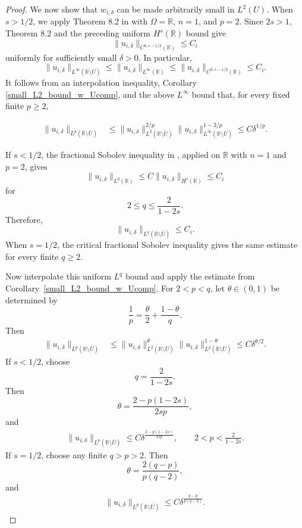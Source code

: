 \documentclass[preprint,12pt]{elsarticle}
\newcommand{\R}{\mathbb R}
\begin{document}
{\begin{proof}
We now show that $w_{i,\delta}$ can be made arbitrarily small in $L^2(U)$. When $s>1/2$, we apply Theorem 8.2 in \cite{NPV} with
$\Omega=\R$, $n=1$, and $p=2$. 
Since $2s>1$, Theorem 8.2 and the preceding uniform
$H^s(\R)$ bound give
\[
    \|u_{i,\delta}\|_{C^{0,s-1/2}(\R)}
    \leq C_i
\]
uniformly for sufficiently small $\delta>0$.
In particular,
\[
    \|u_{i,\delta}\|_{L^\infty(\R\setminus\overline U)}
    \leq
    \|u_{i,\delta}\|_{L^\infty(\R)}
    \leq
    \|u_{i,\delta}\|_{C^{0,s-1/2}(\R)}
    \leq C_i.
\]
It follows from an interpolation inequality, Corollary \ref{small_L2_bound_w_Ucomp}, and the above
$L^\infty$ bound that,
for every fixed finite $p\geq 2$,

\begin{align}\label{1_Lq_bound}
\|u_{i,\delta}\|_{L^p(\R\setminus\overline U)}
&\leq
\|u_{i,\delta}\|_{L^2(\R\setminus\overline U)}^{2/p}
\|u_{i,\delta}\|_{L^\infty(\R\setminus\overline U)}^{1-2/p}\leq C\delta^{1/p}.
\end{align}

If $s<1/2$, the fractional Sobolev inequality in
\cite[Th.~6.7]{NPV}, applied on $\R$ with $n=1$ and $p=2$, gives
\[
    \|u_{i,\delta}\|_{L^q(\R)}
    \leq
    C\|u_{i,\delta}\|_{H^s(\R)}
    \leq C_i
\]
for
\[
    2\leq q\leq\frac{2}{1-2s}.
\]
Therefore,
\[
    \|u_{i,\delta}\|_{L^q(\R\setminus\overline U)}
    \leq C_i.
\]
When $s=1/2$, the critical fractional Sobolev inequality
\cite[Th.~6.10]{NPV} gives the same estimate for every finite
$q\geq2$.

Now interpolate this uniform $L^q$ bound and apply the estimate from Corollary~\ref{small_L2_bound_w_Ucomp}. For $2<p<q$, let
$\theta\in(0,1)$ be determined by
\[
    \frac1p
    =
    \frac{\theta}{2}
    +
    \frac{1-\theta}{q}.
\]
Then
\begin{align*}
    \|u_{i,\delta}\|_{L^p(\R\setminus\overline U)}
    &\leq
    \|u_{i,\delta}\|_{L^2(\R\setminus\overline U)}^\theta
    \|u_{i,\delta}\|_{L^q(\R\setminus\overline U)}^{1-\theta}\leq
    C\delta^{\theta/2}.
\end{align*}
If $s<1/2$, choose
\[
    q=\frac{2}{1-2s}.
\]
Then
\[
    \theta
    =
    \frac{2-p(1-2s)}{2sp},
\]
and 
\begin{align}\label{2_Lq_bound}
    \|u_{i,\delta}\|_{L^p(\R\setminus\overline U)}
    \leq
    C\delta^{\frac{2-p(1-2s)}{4sp}},
    \qquad
    2<p<\frac{2}{1-2s}.
\end{align}
If $s=1/2$, choose any finite $q>p>2$. Then
\[
    \theta
    =
    \frac{2(q-p)}{p(q-2)},
\]
and 
\begin{align}\label{3_Lq_bound}
    \|u_{i,\delta}\|_{L^p(\R\setminus\overline U)}
    \leq
    C\delta^{\frac{q-p}{p(q-2)}}.
\end{align}


\end{proof}}
\end{document}
